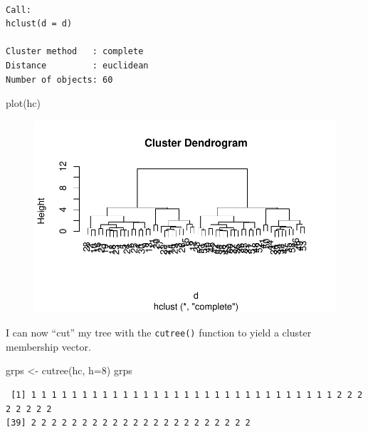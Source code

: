 \documentclass[
  letterpaper,
  DIV=11,
  numbers=noendperiod]{scrartcl}
\newenvironment{Shaded}{\begin{snugshade}}{\end{snugshade}}
\newcommand{\AttributeTok}[1]{\textcolor[rgb]{0.40,0.45,0.13}{#1}}
\newcommand{\DecValTok}[1]{\textcolor[rgb]{0.68,0.00,0.00}{#1}}
\newcommand{\FunctionTok}[1]{\textcolor[rgb]{0.28,0.35,0.67}{#1}}
\newcommand{\NormalTok}[1]{\textcolor[rgb]{0.00,0.23,0.31}{#1}}
\newcommand{\OtherTok}[1]{\textcolor[rgb]{0.00,0.23,0.31}{#1}}
\begin{document}
\begin{verbatim}

Call:
hclust(d = d)

Cluster method   : complete 
Distance         : euclidean 
Number of objects: 60 
\end{verbatim}

\begin{Shaded}
\begin{Highlighting}[]
\FunctionTok{plot}\NormalTok{(hc)}
\end{Highlighting}
\end{Shaded}

\begin{figure}[H]

{\centering \includegraphics{Lab-7_files/figure-pdf/unnamed-chunk-12-1.pdf}

}

\end{figure}

I can now ``cut'' my tree with the \texttt{cutree()} function to yield a
cluster membership vector.

\begin{Shaded}
\begin{Highlighting}[]
\NormalTok{grps }\OtherTok{\textless{}{-}} \FunctionTok{cutree}\NormalTok{(hc, }\AttributeTok{h=}\DecValTok{8}\NormalTok{)}
\NormalTok{grps}
\end{Highlighting}
\end{Shaded}

\begin{verbatim}
 [1] 1 1 1 1 1 1 1 1 1 1 1 1 1 1 1 1 1 1 1 1 1 1 1 1 1 1 1 1 1 1 2 2 2 2 2 2 2 2
[39] 2 2 2 2 2 2 2 2 2 2 2 2 2 2 2 2 2 2 2 2 2 2
\end{verbatim}
\end{document}
